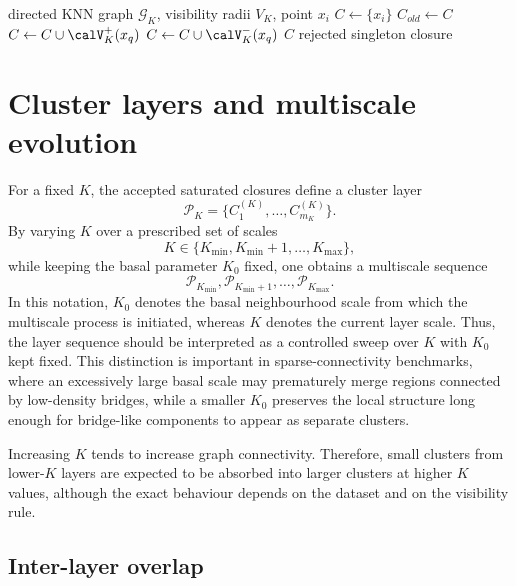 \documentclass[pdflatex,sn-mathphys-num]{sn-jnl}
\newcommand{\calG}{\mathcal{G}}
\newcommand{\calP}{\mathcal{P}}
\begin{document}
\begin{algorithm}[t]
\caption{Visibility-filtered round-trip closure for one point}
\label{alg:visibility_closure}
\begin{algorithmic}[1]
\Require directed KNN graph $\calG_K$, visibility radii $V_K$, point $x_i$
\State $C \gets \{x_i\}$
\Repeat
    \State $C_{old}\gets C$
        \State $C\gets C\cup\calV_K^+(x_q)$
        \State $C\gets C\cup\calV_K^-(x_q)$
    \EndFor
{}
    \State \Return $C$
\Else
    \State \Return rejected singleton closure
\EndIf
\end{algorithmic}
\end{algorithm}

\section{Cluster layers and multiscale evolution}\label{sec:layers}

For a fixed $K$, the accepted saturated closures define a cluster layer
\begin{equation}
\calP_K=\{C_1^{(K)},\ldots,C_{m_K}^{(K)}\}.
\end{equation}
By varying $K$ over a prescribed set of scales
\begin{equation}
K\in\{K_{\min},K_{\min}+1,\ldots,K_{\max}\},
\end{equation}
while keeping the basal parameter $K_0$ fixed, one obtains a multiscale sequence
\begin{equation}
\calP_{K_{\min}},\calP_{K_{\min}+1},\ldots,\calP_{K_{\max}}.
\end{equation}
In this notation, $K_0$ denotes the basal neighbourhood scale from which the multiscale process is initiated, whereas $K$ denotes the current layer scale. Thus, the layer sequence should be interpreted as a controlled sweep over $K$ with $K_0$ kept fixed. This distinction is important in sparse-connectivity benchmarks, where an excessively large basal scale may prematurely merge regions connected by low-density bridges, while a smaller $K_0$ preserves the local structure long enough for bridge-like components to appear as separate clusters.

Increasing $K$ tends to increase graph connectivity. Therefore, small clusters from lower-$K$ layers are expected to be absorbed into larger clusters at higher $K$ values, although the exact behaviour depends on the dataset and on the visibility rule.

\subsection{Inter-layer overlap}
\end{document}

